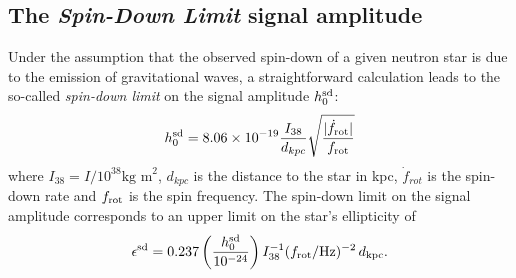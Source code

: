
\subsection{The \emph{Spin-Down Limit} signal amplitude}
\label{box:sdl}
Under the assumption that the observed spin-down of a given neutron star is due to the emission of gravitational waves, a straightforward
calculation leads to the so-called {\it spin-down limit} on the signal amplitude $h_0^{\rm sd}$:
\begin{equation}
  \label{eq:4}
  h_0^{\rm sd} = 8.06\times 10^{-19}\frac{I_{38}}{d_{kpc}}\sqrt{\frac{|\dot{f}_{\rm rot}|}{f_{\rm rot}}}
\end{equation}
where $I_{38} = I / 10^{38}\textrm{kg~m}^2$, $d_{kpc}$ is the distance
to the star in kpc, $\dot{f}_{rot}$ is the spin-down rate and $f_{\rm rot}$ is the
spin frequency.  
The spin-down limit on the signal amplitude corresponds to an upper limit on the star's ellipticity of
\begin{equation}
\epsilon^{\rm sd}=0.237
\left(\frac{h^{\rm sd}_{0}}{10^{-24}}\right)I^{-1}_{38}(f_{\rm rot}/{\rm Hz})^{-2}\,d_{\rm kpc}.
\label{eq:epssd}
\end{equation}

